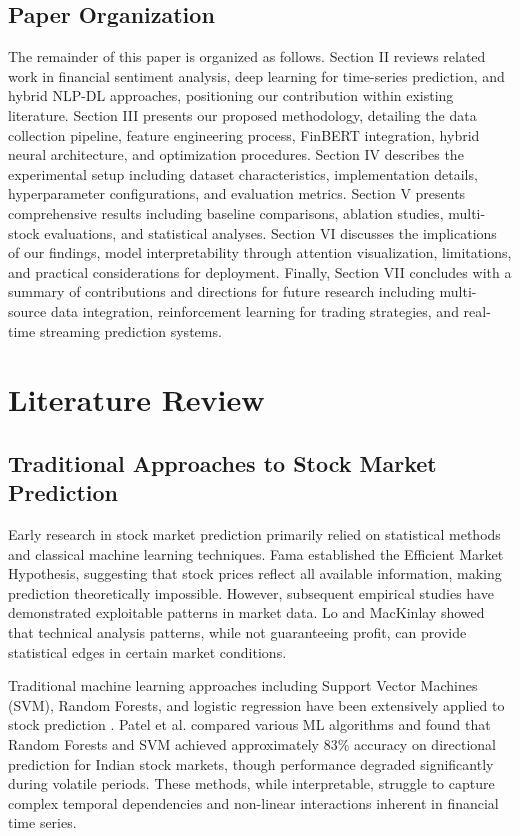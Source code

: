 \documentclass[conference]{IEEEtran}
\begin{document}
\subsection{Paper Organization}

The remainder of this paper is organized as follows. Section II reviews related work in financial sentiment analysis, deep learning for time-series prediction, and hybrid NLP-DL approaches, positioning our contribution within existing literature. Section III presents our proposed methodology, detailing the data collection pipeline, feature engineering process, FinBERT integration, hybrid neural architecture, and optimization procedures. Section IV describes the experimental setup including dataset characteristics, implementation details, hyperparameter configurations, and evaluation metrics. Section V presents comprehensive results including baseline comparisons, ablation studies, multi-stock evaluations, and statistical analyses. Section VI discusses the implications of our findings, model interpretability through attention visualization, limitations, and practical considerations for deployment. Finally, Section VII concludes with a summary of contributions and directions for future research including multi-source data integration, reinforcement learning for trading strategies, and real-time streaming prediction systems.

\section{Literature Review}

\subsection{Traditional Approaches to Stock Market Prediction}

Early research in stock market prediction primarily relied on statistical methods and classical machine learning techniques. Fama \cite{fama1970efficient} established the Efficient Market Hypothesis, suggesting that stock prices reflect all available information, making prediction theoretically impossible. However, subsequent empirical studies have demonstrated exploitable patterns in market data. Lo and MacKinlay \cite{lo2000foundations} showed that technical analysis patterns, while not guaranteeing profit, can provide statistical edges in certain market conditions.

Traditional machine learning approaches including Support Vector Machines (SVM), Random Forests, and logistic regression have been extensively applied to stock prediction \cite{kumar2006forecasting}. Patel et al. \cite{patel2015predicting} compared various ML algorithms and found that Random Forests and SVM achieved approximately 83\% accuracy on directional prediction for Indian stock markets, though performance degraded significantly during volatile periods. These methods, while interpretable, struggle to capture complex temporal dependencies and non-linear interactions inherent in financial time series.
\end{document}
